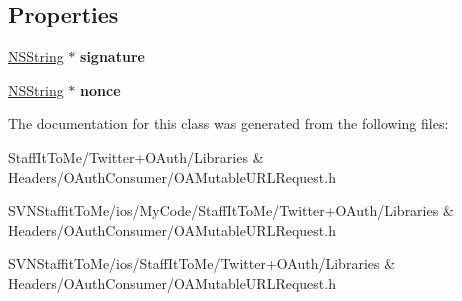 \subsection*{\-Properties}
\begin{DoxyCompactItemize}
\item 
\hypertarget{interface_o_a_mutable_u_r_l_request_a99ea5d383919950f06850c04366f0124}{
\hyperlink{class_n_s_string}{\-N\-S\-String} $\ast$ {\bfseries signature}}
\label{interface_o_a_mutable_u_r_l_request_a99ea5d383919950f06850c04366f0124}

\item 
\hypertarget{interface_o_a_mutable_u_r_l_request_a2b0907148a0f2389479f27668559edc9}{
\hyperlink{class_n_s_string}{\-N\-S\-String} $\ast$ {\bfseries nonce}}
\label{interface_o_a_mutable_u_r_l_request_a2b0907148a0f2389479f27668559edc9}

\end{DoxyCompactItemize}


\-The documentation for this class was generated from the following files\-:\begin{DoxyCompactItemize}
\item 
\-Staff\-It\-To\-Me/\-Twitter+\-O\-Auth/\-Libraries \& Headers/\-O\-Auth\-Consumer/\-O\-A\-Mutable\-U\-R\-L\-Request.\-h\item 
\-S\-V\-N\-Staffit\-To\-Me/ios/\-My\-Code/\-Staff\-It\-To\-Me/\-Twitter+\-O\-Auth/\-Libraries \& Headers/\-O\-Auth\-Consumer/\-O\-A\-Mutable\-U\-R\-L\-Request.\-h\item 
\-S\-V\-N\-Staffit\-To\-Me/ios/\-Staff\-It\-To\-Me/\-Twitter+\-O\-Auth/\-Libraries \& Headers/\-O\-Auth\-Consumer/\-O\-A\-Mutable\-U\-R\-L\-Request.\-h\end{DoxyCompactItemize}
